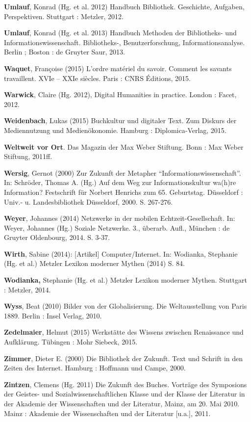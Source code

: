\documentclass[a4paper,
fontsize=11pt,
oneside,
numbers=noperiodatend,
parskip=half-,
bibliography=totoc,
final
]{scrartcl}
\begin{document}
\textbf{Umlauf}, Konrad (Hg. et al. 2012) Handbuch Bibliothek.
Geschichte, Aufgaben, Perspektiven. Stuttgart : Metzler, 2012.

\textbf{Umlauf}, Konrad (Hg. et al. 2013) Handbuch Methoden der
Bibliotheks- und Informationswissenschaft. Bibliotheks-,
Benutzerforschung, Informationsanalyse. Berlin ; Boston : de Gruyter
Saur, 2013.

\textbf{Waquet}, Françoise (2015) L'ordre matériel du savoir. Comment
les savants travaillent. XVIe -- XXIe siècles. Paris : CNRS Éditions,
2015.

\textbf{Warwick}, Claire (Hg. 2012), Digital Humanities in practice.
London : Facet, 2012.

\textbf{Weidenbach}, Lukas (2015) Buchkultur und digitaler Text. Zum
Diskurs der Mediennutzung und Medienökonomie. Hamburg :
Diplomica-Verlag, 2015.

\textbf{Weltweit vor Ort}. Das Magazin der Max Weber Stiftung. Bonn :
Max Weber Stiftung, 2011ff.

\textbf{Wersig}, Gernot (2000) Zur Zukunft der Metapher
\enquote{Informationswissenschaft}. In: Schröder, Thomas A. (Hg.) Auf
dem Weg zur Informationskultur wa(h)re Information? Festschrift für
Norbert Henrichs zum 65. Geburtstag. Düsseldorf : Univ.- u.
Landesbibliothek Düsseldorf, 2000. S. 267-276.

\textbf{Weyer}, Johannes (2014) Netzwerke in der mobilen
Echtzeit-Gesellschaft. In: Weyer, Johannes (Hg.) Soziale Netzwerke. 3.,
überarb. Aufl., München : de Gruyter Oldenbourg, 2014. S. 3-37.

\textbf{Wirth}, Sabine (2014): {[}Artikel{]} Computer/Internet. In:
Wodianka, Stephanie (Hg. et al.) Metzler Lexikon moderner Mythen (2014)
S. 84.

\textbf{Wodianka,} Stephanie (Hg. et al.) Metzler Lexikon moderner
Mythen. Stuttgart : Metzler, 2014.

\textbf{Wyss}, Beat (2010) Bilder von der Globalisierung. Die
Weltausstellung von Paris 1889. Berlin : Insel Verlag, 2010.

\textbf{Zedelmaier}, Helmut (2015) Werkstätte des Wissens zwischen
Renaissance und Aufklärung. Tübingen : Mohr Siebeck, 2015.

\textbf{Zimmer}, Dieter E. (2000) Die Bibliothek der Zukunft. Text und
Schrift in den Zeiten des Internet. Hamburg : Hoffmann und Campe, 2000.

\textbf{Zintzen}, Clemens (Hg. 2011) Die Zukunft des Buches. Vorträge
des Symposions der Geistes- und Sozialwissenschaftlichen Klasse und der
Klasse der Literatur in der Akademie der Wissenschaften und der
Literatur, Mainz, am 20. Mai 2010. Mainz : Akademie der Wissenschaften
und der Literatur {[}u.a.{]}, 2011.
\end{document}
